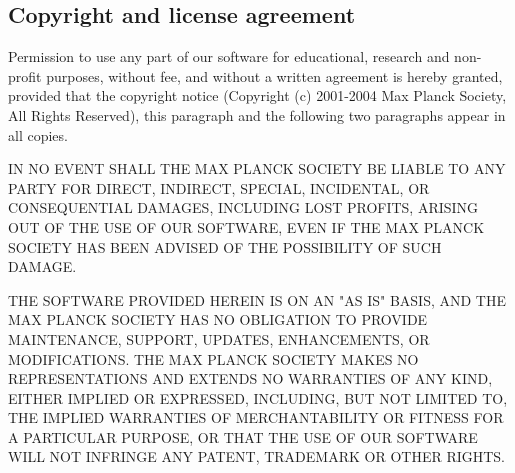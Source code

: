 \documentclass{article}
\begin{document}
\subsection*{Copyright and license agreement}
Permission to use any part of our software for educational, research and non-profit purposes, without fee, and without a written agreement is hereby granted, provided that the copyright notice (Copyright (c) 2001-2004 Max Planck Society, All Rights Reserved), this paragraph and the following two paragraphs appear in all copies.

IN NO EVENT SHALL THE MAX PLANCK SOCIETY BE LIABLE TO ANY PARTY
FOR DIRECT, INDIRECT, SPECIAL, INCIDENTAL, OR CONSEQUENTIAL DAMAGES,
INCLUDING LOST PROFITS, ARISING OUT OF THE USE OF OUR SOFTWARE,
EVEN IF THE MAX PLANCK SOCIETY HAS BEEN ADVISED OF THE
POSSIBILITY OF SUCH DAMAGE.

THE SOFTWARE PROVIDED HEREIN IS ON AN "AS IS" BASIS, AND
THE MAX PLANCK SOCIETY HAS NO OBLIGATION TO PROVIDE MAINTENANCE,
SUPPORT, UPDATES, ENHANCEMENTS, OR MODIFICATIONS.  THE MAX PLANCK SOCIETY
MAKES NO REPRESENTATIONS AND EXTENDS NO WARRANTIES OF ANY
KIND, EITHER IMPLIED OR EXPRESSED, INCLUDING, BUT NOT LIMITED TO, THE
IMPLIED WARRANTIES OF MERCHANTABILITY OR FITNESS FOR A PARTICULAR
PURPOSE, OR THAT THE USE OF OUR SOFTWARE WILL NOT INFRINGE
ANY PATENT, TRADEMARK OR OTHER RIGHTS.
\end{document}
